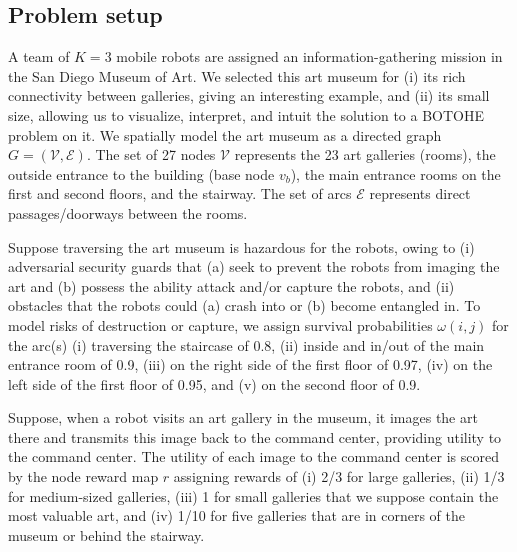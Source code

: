 \documentclass[fleqn,10pt,lineno]{wlpeerj}
\begin{document}
\subsection{Problem setup} 
A team of $K=3$ mobile robots are assigned an information-gathering mission in the San Diego Museum of Art. 
We selected this art museum for (i) its rich connectivity between galleries, giving an interesting example, and (ii) its small size, allowing us to visualize, interpret, and intuit the solution to a BOTOHE problem on it.
We spatially model the art museum as a directed graph $G=(\mathcal{V}, \mathcal{E})$.
The set of 27 nodes $\mathcal{V}$ represents the 23 art galleries (rooms), the outside entrance to the building (base node $v_b$), the main entrance rooms on the first and second floors, and the stairway.
The set of arcs $\mathcal{E}$ represents direct passages/doorways between the rooms. %

Suppose traversing the art museum is hazardous for the robots, owing to
(i) adversarial security guards that (a) seek to prevent the robots from imaging the art and (b) possess the ability attack and/or capture the robots, and
(ii) obstacles that the robots could (a) crash into or (b) become entangled in.
To model risks of destruction or capture, we assign survival probabilities $\omega(i,j)$ for the arc(s)
(i) traversing the staircase of 0.8,
(ii) inside and in/out of the main entrance room of 0.9,
(iii) on the right side of the first floor of 0.97,
(iv) on the left side of the first floor of 0.95,
and
(v) on the second floor of 0.9.

Suppose, when a robot visits an art gallery in the museum, it images the art there and transmits this image back to the command center, providing utility to the command center. 
The utility of each image to the command center is scored by
the node reward map $r$ assigning rewards of
(i) 2/3 for large galleries,
(ii) 1/3 for medium-sized galleries,
(iii) 1 for small galleries that we suppose contain the most valuable art, and
(iv) 1/10 for five galleries that are in corners of the museum or behind the stairway.
\end{document}
